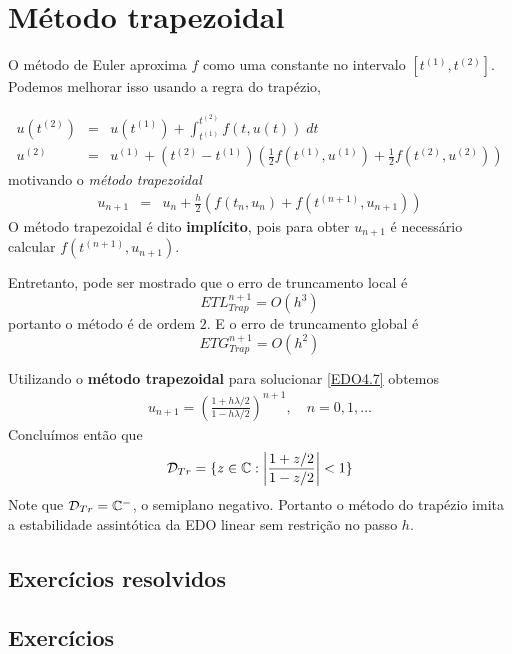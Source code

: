 \section{Método trapezoidal}
O método de Euler aproxima $f$ como uma constante no intervalo $[t^{(1)},t^{(2)}]$. Podemos melhorar isso usando a regra do trapézio,

\begin{eqnarray}
  u(t^{(2)}) &=& u(t^{(1)}) +  \int _{t^{(1)}}^{t^{(2)}}  f(t,u(t)) \; dt \\
  u^{(2)}    &=&   u^{(1)}  +  (t^{(2)}-t^{(1)})\left(\frac{1}{2}f(t^{(1)},u^{(1)})+\frac{1}{2}f(t^{(2)},u^{(2)})\right)
\end{eqnarray}
motivando o \emph{método trapezoidal}
\begin{eqnarray}
  u_{n+1} &=& u_n +  \frac{h}{2} \left(f(t_n,u_n)+f(t^{(n+1)},u_{n+1})\right)
\end{eqnarray}
O método trapezoidal é dito \textbf{implícito}, pois para obter $u_{n+1}$ é necessário calcular $f(t^{(n+1)},u_{n+1})$.

Entretanto, pode ser mostrado que o erro de truncamento local é
$$ETL_{Trap}^{n+1}= O(h^3)$$
portanto o método é de ordem $2$. E o erro de truncamento global é
$$ETG_{Trap}^{n+1}= O(h^2)$$


\begin{ex}
Utilizando o \textbf{método trapezoidal} para solucionar \eqref{EDO4.7} obtemos
\begin{eqnarray}
 u_{n+1} = \left(\frac{1+ h\lambda /2}{1- h\lambda /2}\right)^{n+1}, \quad  n=0,1,\ldots
\end{eqnarray}
Concluímos então que
\begin{eqnarray}
 \mathcal D_{Tr} = \{z \in  \mathbb{C}:  \left|\frac{1+ z/2}{1- z/2}\right|<1\}
\end{eqnarray}
Note que $\mathcal D_{Tr}=\mathbb{C}^-$, o semiplano negativo. Portanto o método do trapézio imita a estabilidade assintótica da EDO linear sem restrição no passo $h$.
\end{ex}



\subsection*{Exercícios resolvidos}

\emconstrucao

\subsection*{Exercícios}

